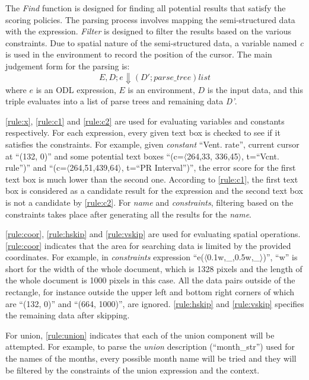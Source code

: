 The {\em Find} function is 
designed for finding all potential results that satisfy the scoring policies. 
The parsing process involves mapping the semi-structured data with the expression. 
{\em Filter} is designed to filter the results based on the various constraints. 
Due to spatial nature of the semi-structured data, 
a variable named {\em c} is used 
in the environment to record the position of the cursor.
The main judgement form for the parsing is:
\[
  E,D;e \Downarrow (D';parse\_tree)list
  \label{semantics:judegement} 
\]
where $e$ is an ODL expression, $E$ is an environment, $D$ is the 
input data, and this triple evaluates into a list of parse trees and 
remaining data {\em D'}.

\ref{rule:x}, \ref{rule:c1} and \ref{rule:c2} are used 
for evaluating variables and constants respectively. 
For each expression, every given text box is checked to see if
it satisfies the constraints. 
For example, given {\em constant} ``Vent. rate'', 
current cursor at ``(132, 0)'' and some potential text boxes 
``(c=$\langle$264,33, 336,45$\rangle$, t=``Vcnt. rule'')'' and 
``(c=$\langle$264,51,439,64$\rangle$, t=``PR Interval'')'', 
the error score for the first text box is much lower than the second one. 
According to \ref{rule:c1}, the first text box is considered as a 
candidate result for the expression and the 
second text box is not a candidate by \ref{rule:c2}. 
For {\em name} and {\em constraints}, filtering based on the constraints 
takes place after generating all the results for the {\em name}. 

\ref{rule:coor}, \ref{rule:hskip} and \ref{rule:vskip} 
are used for evaluating spatial operations. \ref{rule:coor} indicates 
that the area for searching data is  
limited by the provided coordinates. 
For example, in {\em constraints} expression 
``e($\langle$0.1w,\_,0.5w,\_$\rangle$)'', ``w'' is short for the 
width of the whole document, which is 1328 pixels and the 
length of the whole document is 1000 pixels in this case. 
All the data pairs outside of 
the rectangle, for instance outside the upper left and bottom right corners of which are ``(132, 0)'' and ``(664, 1000)'', are ignored. 
\ref{rule:hskip} and \ref{rule:vskip} 
specifies the remaining data after skipping. 

For union, \ref{rule:union} indicates that each of the union component 
will be attempted. For example, to parse the 
{\em union} description (``month\_str'') used for the names of the months, 
every possible month name will be tried and they will be filtered 
by the constraints of the union expression and the context. 


